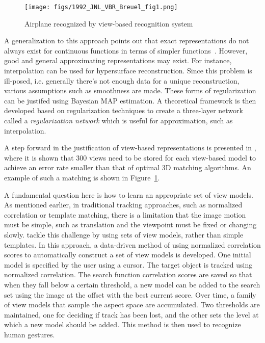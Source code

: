 								\begin{figure}[t]
								\center
								\texttt{[image: figs/1992\_JNL\_VBR\_Breuel\_fig1.png]}
								\caption{Airplane recognized by view-based recognition system \cite{1992_JNL_VBR_Breuel}}
								\label{fig:1992_JNL_VBR_Breuel_fig1}
								\end{figure}

A generalization to this approach points out that exact representations do not always exist for continuous functions in terms of simpler functions~\cite{1990_JNL_Network_Poggio}.  However, good and general approximating representations may exist.  For instance, interpolation can be used for hypersurface reconstruction.  Since this problem is ill-posed, i.e. generally there's not enough data for a unique reconstruction, various assumptions such as smoothness are made.  These forms of regularization can be justifed using Bayesian MAP estimation.  A theoretical framework is then developed based on regularization techniques to create a three-layer network called a \emph{regularization network} which is useful for approximation, such as interpolation.

A step forward in the justification of view-based representations is presented in  \cite{1992_JNL_VBR_Breuel}, where it is shown that 300 views need to be stored for each view-based model to achieve an error rate smaller than that of optimal 3D matching algorithms.  An example of such a matching is shown in Figure~\ref{fig:1992_JNL_VBR_Breuel_fig1}.%

A fundamental question here is how to learn an appropriate set of view models.  As mentioned earlier, in traditional tracking approaches, such as normalized correlation or template matching, there is a limitation that the image motion must be simple, such as translation and the viewpoint must be fixed or changing slowly.  \cite{1993_CNF_Gestures_Darrell} tackle this challenge by using sets of view models, rather than simple templates.  In this approach, a data-driven method of using normalized correlation scores to automatically construct a set of view models is developed.  One initial model is specified by the user using a cursor.  The target object is tracked using normalized correlation.  The search function correlation scores are saved so that when they fall below a certain threshold, a new model can be added to the search set using the image at the offset with the best current score.  Over time, a family of view models that sample the aspect space are accumulated.  Two thresholds are maintained, one for deciding if track has been lost, and the other sets the level at which a new model should be added.  This method is then used to recognize human gestures.

